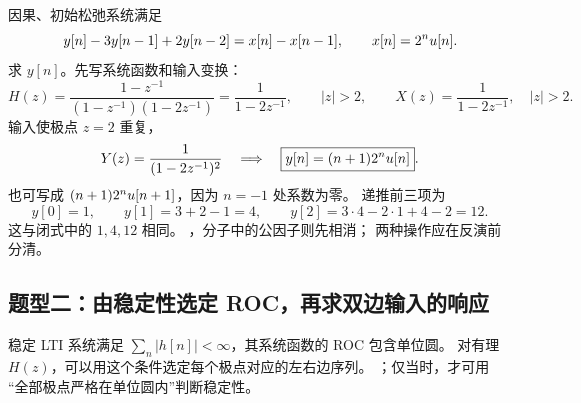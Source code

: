 \begin{example}[输入与系统的极点重合]
\label{eg:z-repeated-pole-response}
  因果、初始松弛系统满足
  \[
    y[n]-3y[n-1]+2y[n-2]=x[n]-x[n-1],
    \qquad x[n]=2^nu[n].
  \]
  求 $y[n]$。先写系统函数和输入变换：
  \[
    H(z)=\frac{1-z^{-1}}
      {(1-z^{-1})(1-2z^{-1})}
      =\frac1{1-2z^{-1}},\qquad |z|>2,
    \qquad
    X(z)=\frac1{1-2z^{-1}},\quad |z|>2.
  \]
  输入使极点 $z=2$ 重复，
  \[
    Y(z)=\frac1{(1-2z^{-1})^2}
    \quad\Longrightarrow\quad
    \boxed{y[n]=(n+1)2^nu[n]}.
  \]
  也可写成 $(n+1)2^nu[n+1]$，因为 $n=-1$ 处系数为零。
  递推前三项为
  \[
    y[0]=1,\qquad y[1]=3+2-1=4,\qquad
    y[2]=3\cdot4-2\cdot1+4-2=12.
  \]
  这与闭式中的 $1,4,12$ 相同。
  ，分子中的公因子则先相消；
  两种操作应在反演前分清。
\end{example}

\subsection{题型二：由稳定性选定 ROC，再求双边输入的响应}
\label{subsec:z-stable-two-sided-response}

稳定 LTI 系统满足 $\sum_n|h[n]|<\infty$，其系统函数的 ROC 包含单位圆。
对有理 $H(z)$，可以用这个条件选定每个极点对应的左右边序列。
；仅当时，才可用
“全部极点严格在单位圆内”判断稳定性。

